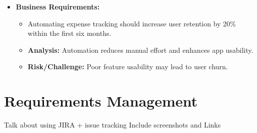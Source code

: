 \begin{itemize}
    \item \textbf{Business Requirements:}
    \begin{itemize}
        \item Automating expense tracking should increase user retention by 20\% within the first six months.
        \item \textbf{Analysis:} Automation reduces manual effort and enhances app usability.
        \item \textbf{Risk/Challenge:} Poor feature usability may lead to user churn.
    \end{itemize}
\end{itemize}


\section{Requirements Management}
Talk about using JIRA + issue tracking 
Include screenshots and Links 
